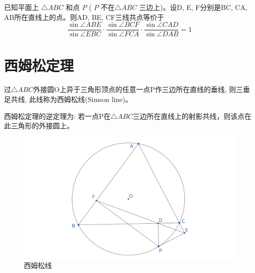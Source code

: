 \begin{theorem}[角元形式赛瓦定理]
    已知平面上 $\triangle A B C$ 和点 $P$ ( $P$ 不在$\triangle A B C$ 三边上)。设D, E, F分别是BC, CA, AB所在直线上的点。则AD, BE, CF三线共点等价于
    $$
    \frac{\sin \angle ABE}{\sin \angle EBC}
    \cdot 
    \frac{\sin \angle BCF}{\sin \angle FCA}
    \cdot 
    \frac{\sin \angle CAD}{\sin \angle DAB}
    =1
    $$
\end{theorem}


\newpage 
\section{西姆松定理}
\begin{theorem}
过$\triangle ABC$外接圆O上异于三角形顶点的任意一点P作三边所在直线的垂线, 则三垂足共线, 此线称为西姆松线(Simson line)。

西姆松定理的逆定理为: 若一点P在$\triangle ABC$三边所在直线上的射影共线，则该点在此三角形的外接圆上。
\end{theorem}

\begin{figure}[H]
    \centering
    \includegraphics[width=\linewidth]{figures/西姆松线.png}
    \caption{西姆松线}
\end{figure}


\newpage
